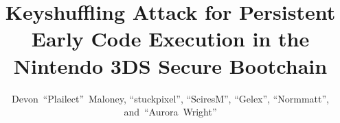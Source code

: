\documentclass[journal]{IEEEtran}
\begin{document}
%
\title{Keyshuffling Attack for Persistent Early Code Execution in the Nintendo
3DS Secure Bootchain}
%
%
%

\author{Devon~``Plailect''~Maloney, ``stuckpixel'', ``SciresM'', ``Gelex'', ``Normmatt'', and~``Aurora~Wright''\vspace{-2.0em}}

% 
%

\maketitle
\end{document}
